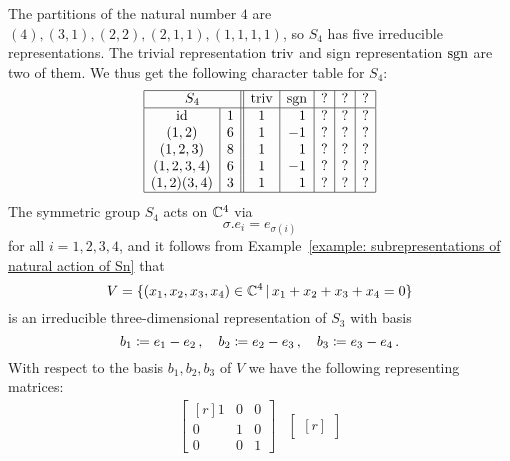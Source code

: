 \begin{example}
  The partitions of the natural number $4$ are $(4), (3,1), (2,2), (2,1,1), (1,1,1,1)$, so $S_4$ has five irreducible representations.
  The trivial representation $\operatorname{triv}$ and sign representation $\operatorname{sgn}$ are two of them.
  We thus get the following character table for $S_4$:
  \[
    \begin{array}{|c|c||c|c|c|c|c|}
      \hline
        \multicolumn{2}{|c||}{S_4}
      & \triv
      & \sgn
      & ?
      & ?
      & ?
      \\
      \hline
        \id
      & 1
      &            1
      & \phantom{-}1
      &            ?
      &            ?
      &            ?
      \\
        (1,2)
      & 6
      &            1
      &           -1
      &            ?
      &            ?
      &            ?
      \\
        (1,2,3)
      & 8
      &            1
      & \phantom{-}1
      &            ?
      &            ?
      &            ?
      \\
        (1,2,3,4)
      & 6
      &            1
      &           -1
      &            ?
      &            ?
      &            ?
      \\
        (1,2)(3,4)
      & 3
      &            1
      & \phantom{-}1
      &            ?
      &            ?
      &            ?
      \\
      \hline
    \end{array}
  \]
  The symmetric group $S_4$ acts on $\mathbb{C}^4$ via
  \[
      \sigma.e_i
    = e_{\sigma(i)}
  \]
  for all $i = 1, 2, 3, 4$, and it follows from Example~\ref{example: subrepresentations of natural action of Sn} that
  \[
      V
    = \{
        (x_1, x_2, x_3, x_4) \in \Complex^4
      \suchthat
        x_1 + x_2 + x_3 + x_4 = 0
      \}
  \]
  is an irreducible three-dimensional representation of $S_3$ with basis
  \[
    b_1 \coloneqq e_1 - e_2 \,,
    \quad
    b_2 \coloneqq e_2 - e_3 \,,
    \quad
    b_3 \coloneqq e_3 - e_4 \,.
  \]
  With respect to the basis $b_1, b_2, b_3$ of $V$ we have the following representing matrices:
  \[
    \begin{array}{ccccc}
        \begin{bmatrix*}[r]
          1 & 0 & 0 \\
          0 & 1 & 0 \\
          0 & 0 & 1
        \end{bmatrix*}
      & \begin{bmatrix*}[r]

\end{bmatrix*}
\end{array}\]
\end{example}
